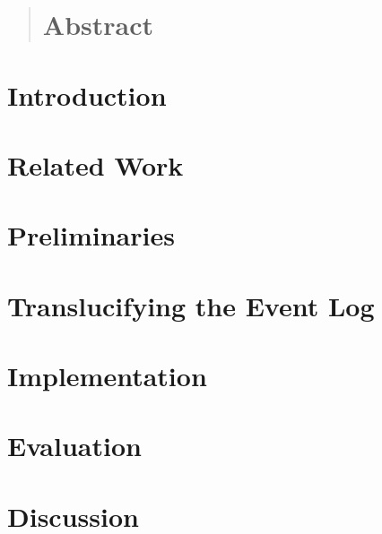 \documentclass[a4paper,11pt,twoside]{pads-thesis}
\begin{document}

\gTitlePage

\begin{abstract}
\chapter*{Abstract} 

\end{abstract}

\tableofcontents

\cleardoublepage
\pagestyle{fancy}

\chapter{Introduction} \label{chap:intro}


\chapter{Related Work} \label{chap:related_work}


\chapter{Preliminaries} \label{chap:prelim}


\chapter{Translucifying the Event Log} \label{chap:method}


\chapter{Implementation} \label{chap:impl}


\chapter{Evaluation} \label{chap:eval}


\chapter{Discussion} \label{chap:discussion}

\end{document}
